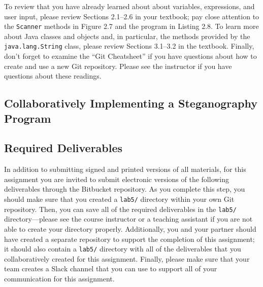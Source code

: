 To review that you have already learned about about variables, expressions, and user input, please review Sections
2.1--2.6 in your textbook; pay close attention to the {\tt Scanner} methods in Figure 2.7 and the program in Listing
2.8. To learn more about Java classes and objects and, in particular, the methods provided by the {\tt java.lang.String}
class, please review Sections 3.1--3.2 in the textbook. Finally, don't forget to examine the ``Git Cheatsheet'' if you
have questions about how to create and use a new Git repository. Please see the instructor if you have questions
about these readings.

\subsection*{Collaboratively Implementing a Steganography Program}
\vspace{-0.05in}

\vspace*{-.1in}
\subsection*{Required Deliverables}

In addition to submitting signed and printed versions of all materials, for this assignment you are invited to submit
electronic versions of the following deliverables through the Bitbucket repository. As you complete this step, you
should make sure that you created a {\tt lab5/} directory within your own Git repository.  Then, you can save all of the
required deliverables in the {\tt lab5/} directory---please see the course instructor or a teaching assistant if you are
not able to create your directory properly. Additionally, you and your partner should have created a separate repository
to support the completion of this assignment; it should also contain a {\tt lab5/} directory with all of the
deliverables that you collaboratively created for this assignment. Finally, please make sure that your team creates a
Slack channel that you can use to support all of your communication for this assignment.


